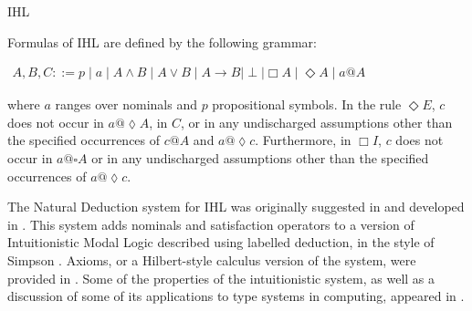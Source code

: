 \begin{entry}{IHL}
\begin{clarifications}
  Formulas of IHL are defined by the following grammar:
  \begin{center} 
    \begin{math}
      \begin{array}{lll}
        A,B,C ::= p \mid a \mid A \land B \mid A \lor B \mid A \to B \mid \perp \mid \Box A \mid \Diamond A \mid a @ A
      \end{array}
    \end{math}
  \end{center}
  where $a$ ranges over nominals and $p$ propositional symbols. In the
  rule $\Diamond E$, $c$ does not occur in $a@ \lozenge A $, in $C$,
  or in any undischarged assumptions other than the specified
  occurrences of $c@ A$ and $a@ \lozenge c $.  Furthermore, in $\Box
  I$, $c$ does not occur in $a@\square A $ or in any undischarged
  assumptions other than the specified occurrences of $a@ \lozenge c$.
\end{clarifications}

\begin{history}
  
The Natural Deduction system for IHL was originally suggested in
\cite{braunerdepaiva2003} and developed in \cite{braunerdepaiva2006}.
This system adds nominals and satisfaction operators to a version of
Intuitionistic Modal Logic described using labelled deduction, in the
style of Simpson \cite{simpson1994}.  Axioms, or a Hilbert-style
calculus version of the system, were provided in \cite{brauner2006}.
Some of the properties of the intuitionistic system, as well as a
discussion of some of its applications to type systems in computing,
appeared in \cite{brauner2011}.
\end{history}


\end{entry}

